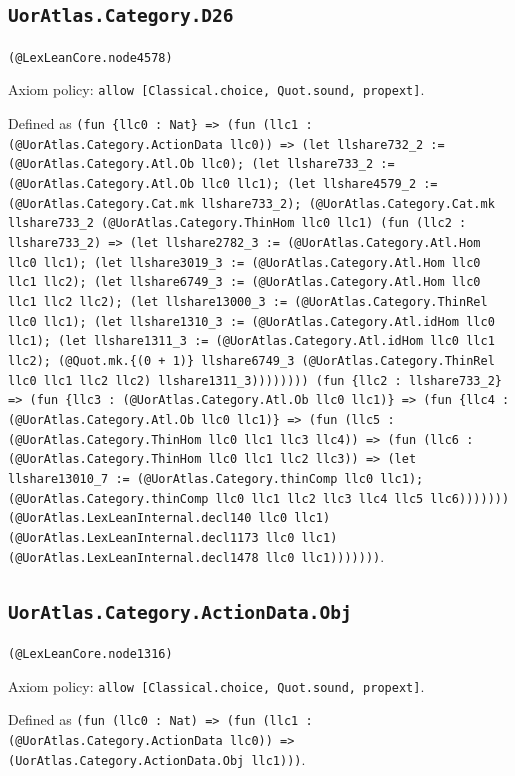 \documentclass[11pt]{article}
\begin{document}
\subsection*{\texttt{UorAtlas.Category.D26}}
\noindent\texttt{(@LexLeanCore.node4578)}\par
\noindent Axiom policy: \texttt{allow [Classical.choice, Quot.sound, propext]}.\par
\noindent Defined as \texttt{(fun \{llc0 : Nat\} => (fun (llc1 : (@UorAtlas.Category.ActionData llc0)) => (let llshare732\_2 := (@UorAtlas.Category.Atl.Ob llc0); (let llshare733\_2 := (@UorAtlas.Category.Atl.Ob llc0 llc1); (let llshare4579\_2 := (@UorAtlas.Category.Cat.mk llshare733\_2); (@UorAtlas.Category.Cat.mk llshare733\_2 (@UorAtlas.Category.ThinHom llc0 llc1) (fun (llc2 : llshare733\_2) => (let llshare2782\_3 := (@UorAtlas.Category.Atl.Hom llc0 llc1); (let llshare3019\_3 := (@UorAtlas.Category.Atl.Hom llc0 llc1 llc2); (let llshare6749\_3 := (@UorAtlas.Category.Atl.Hom llc0 llc1 llc2 llc2); (let llshare13000\_3 := (@UorAtlas.Category.ThinRel llc0 llc1); (let llshare1310\_3 := (@UorAtlas.Category.Atl.idHom llc0 llc1); (let llshare1311\_3 := (@UorAtlas.Category.Atl.idHom llc0 llc1 llc2); (@Quot.mk.\{(0 + 1)\} llshare6749\_3 (@UorAtlas.Category.ThinRel llc0 llc1 llc2 llc2) llshare1311\_3)))))))) (fun \{llc2 : llshare733\_2\} => (fun \{llc3 : (@UorAtlas.Category.Atl.Ob llc0 llc1)\} => (fun \{llc4 : (@UorAtlas.Category.Atl.Ob llc0 llc1)\} => (fun (llc5 : (@UorAtlas.Category.ThinHom llc0 llc1 llc3 llc4)) => (fun (llc6 : (@UorAtlas.Category.ThinHom llc0 llc1 llc2 llc3)) => (let llshare13010\_7 := (@UorAtlas.Category.thinComp llc0 llc1); (@UorAtlas.Category.thinComp llc0 llc1 llc2 llc3 llc4 llc5 llc6))))))) (@UorAtlas.LexLeanInternal.decl140 llc0 llc1) (@UorAtlas.LexLeanInternal.decl1173 llc0 llc1) (@UorAtlas.LexLeanInternal.decl1478 llc0 llc1)))))))}.\par
\subsection*{\texttt{UorAtlas.Category.ActionData.Obj}}
\noindent\texttt{(@LexLeanCore.node1316)}\par
\noindent Axiom policy: \texttt{allow [Classical.choice, Quot.sound, propext]}.\par
\noindent Defined as \texttt{(fun (llc0 : Nat) => (fun (llc1 : (@UorAtlas.Category.ActionData llc0)) => (UorAtlas.Category.ActionData.Obj llc1)))}.\par
\end{document}
